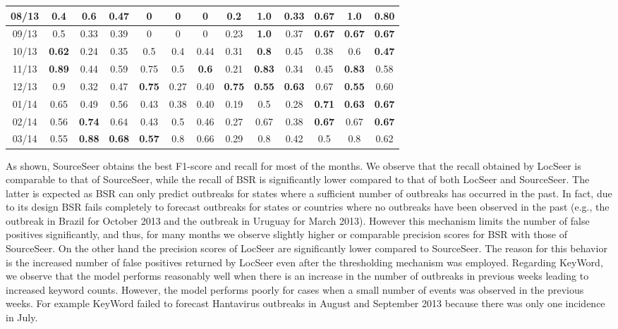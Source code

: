 \documentclass[twoside,leqno,twocolumn]{article}
\newcommand{\fullmodel}{{{\sf SourceSeer}}\xspace}
\newcommand{\locationmodel}{{\sf LocSeer}\xspace}
\newcommand{\keymodel}{{\sf KeyWord}\xspace}
\begin{document}
\begin{table}[ht]
\begin{tabular}{|c|c|c|c|c|c|c|c|c|c|c|c|c|}
    \hline
    08/13 & 0.4 & 0.6 & 0.47 & 0& 0& 0& 0.2 & {\bf 1.0} & 0.33 & {\bf 0.67} & {\bf 1.0} & {\bf 0.80}\\ 
    \hline
    09/13 & 0.5 & 0.33 & 0.39 & 0& 0& 0& 0.23 & {\bf 1.0} & 0.37 & {\bf 0.67} & {\bf 0.67} & {\bf 0.67}\\ 
    \hline
    10/13 & {\bf 0.62} & 0.24 & 0.35 & 0.5& 0.4& 0.44& 0.31 & {\bf 0.8} & 0.45 & 0.38 & 0.6 & {\bf 0.47}\\ 
    \hline
    11/13 & {\bf 0.89} & 0.44 & 0.59 & 0.75& 0.5& {\bf 0.6}& 0.21 & {\bf 0.83} & 0.34 & 0.45 & {\bf 0.83} & 0.58\\ 
    \hline
    12/13 & 0.9 & 0.32 & 0.47 & {\bf 0.75}& 0.27& 0.40& {\bf 0.75} & {\bf 0.55} & {\bf 0.63} & 0.67 & {\bf 0.55} & 0.60\\ 
    \hline
    01/14 & 0.65 & 0.49 & 0.56 & 0.43& 0.38& 0.40& 0.19 & 0.5 & 0.28 &  {\bf 0.71}& {\bf 0.63} & {\bf 0.67}\\ 
    \hline
    02/14 & 0.56 & {\bf 0.74} & 0.64 & 0.43 & 0.5 & 0.46 & 0.27 &  0.67 & 0.38 & {\bf 0.67} & 0.67 & {\bf 0.67}\\ 
    \hline
    03/14 & 0.55 & {\bf 0.88} & {\bf 0.68} & {\bf 0.57} & 0.8& 0.66& 0.29 & 0.8 & 0.42 & 0.5 & 0.8 & 0.62 \\ 
    \hline
  \end{tabular}
  \vspace{-10pt}
  \label{tab:results}
\end{table}

As shown, \fullmodel  obtains the best F1-score and recall for most of the months. We observe that the recall obtained by \locationmodel is comparable to that of \fullmodel, while the recall of BSR is significantly lower compared to that of both \locationmodel and \fullmodel. The latter is expected as BSR can only predict outbreaks for states where a sufficient number of outbreaks has occurred in the past. In fact, due to its design BSR fails completely to forecast outbreaks for states or countries where no outbreaks have been observed in the past (e.g., the outbreak in Brazil for October 2013 and the outbreak in Uruguay for March 2013).  However this mechanism limits the number of false positives significantly, and thus, for many months we observe slightly higher or comparable precision scores for BSR with those of \fullmodel. On the other hand the precision scores of \locationmodel are significantly lower compared to \fullmodel. The reason for this behavior is the increased number of false positives returned by \locationmodel even after the thresholding mechanism was employed. Regarding \keymodel, we observe that the model performs reasonably well when there is an increase in the number of outbreaks in previous weeks leading to increased keyword counts. However, the model performs poorly for cases when a small number of events was observed in the previous weeks. For example \keymodel failed to forecast Hantavirus outbreaks in August  and September 2013 because there was only one incidence in July. 
\end{document}
